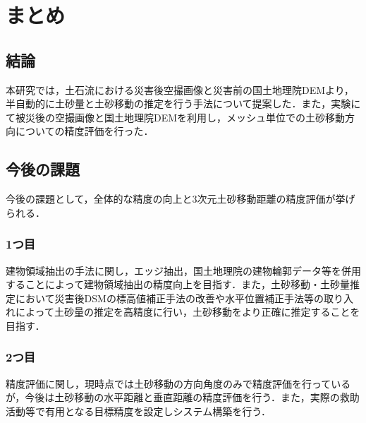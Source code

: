 \chapter{まとめ}
  \section{結論}
    本研究では，土石流における災害後空撮画像と災害前の国土地理院DEMより，半自動的に土砂量と土砂移動の推定を行う手法について提案した．また，実験にて被災後の空撮画像と国土地理院DEMを利用し，メッシュ単位での土砂移動方向についての精度評価を行った．
  
  
  \section{今後の課題}
    今後の課題として，全体的な精度の向上と3次元土砂移動距離の精度評価が挙げられる．

    \subsection{1つ目}
      建物領域抽出の手法に関し，エッジ抽出，国土地理院の建物輪郭データ等を併用することによって建物領域抽出の精度向上を目指す．また，土砂移動・土砂量推定において災害後DSMの標高値補正手法の改善や水平位置補正手法\cite{課題1}等の取り入れによって土砂量の推定を高精度に行い，土砂移動をより正確に推定することを目指す．

    \subsection{2つ目}
      精度評価に関し，現時点では土砂移動の方向角度のみで精度評価を行っているが，今後は土砂移動の水平距離と垂直距離の精度評価を行う．また，実際の救助活動等で有用となる目標精度を設定しシステム構築を行う．
